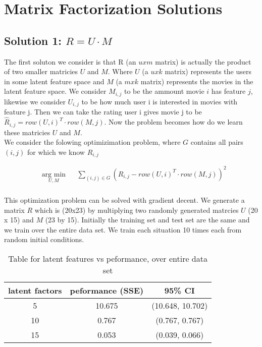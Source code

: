 \documentclass{article}
\begin{document}
\section{Matrix Factorization Solutions}
\subsection{Solution 1: $R = U \cdot M$}
The first soluton we consider is that R (an $u x m$ matrix) is actually the product of two smaller matricies $U$ and $M$. Where $U$ (a $u x k$ matrix) represents the users in some latent feature space and $M$ (a $m x k$ matrix) represents the movies in the latent feature space. We consider $M_{i,j}$ to be the ammount movie $i$ has feature $j$, likewise we consider $U_{i,j}$ to be how much user i is interested in movies with feature j. Then we can take the rating user i gives movie j to be $\hat{R}_{i,j} = row(U, i)^T \cdot row(M, j)$. Now the problem becomes how do we learn these matricies $U$ and $M$.\\

We consider the folowing optimizimation problem, where $G$ contains all pairs $(i,j)$ for which we know $R_{i,j}$

\begin{equation*}
\begin{aligned}
& \underset{U, M}{\text{arg min}}
& & \sum_{(i,j) \in G} (R_{i,j} - row(U, i)^T \cdot row(M, j))^2  \\
\end{aligned}
\end{equation*}

This optimization problem can be solved with gradient decent. We generate a matrix $R$ which is (20x23) by multiplying two randomly generated matrcies $U$ (20 x 15) and $M$ (23 by 15). Initially the training set and test set are the same and we train over the entire data set. We train each situation 10 times each from random initial conditions.

\begin{table}[H]
\centering
\begin{tabular}{| c | c | c |}
\hline
latent factors & peformance (SSE) & 95\% CI \\
\hline
\hline
5 & 10.675 & (10.648, 10.702)\\
10 & 0.767 & (0.767, 0.767)\\
15 & 0.053 & (0.039, 0.066) \\
\hline
\end{tabular}
\caption{Table for latent features vs peformance, over entire data set}
\end{table}
\end{document}
